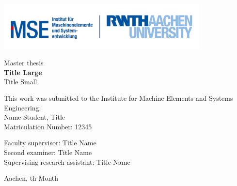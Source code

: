 
\begin{flushright}
\includegraphics[width=0.8\textwidth]{images/logo1.jpg}
\end{flushright}


\begin{flushleft}

\vspace*{3cm}

Master thesis\\
\vspace{1cm}
\Large\textbf{Title Large}\\
\vspace{0.3 cm}
\normalsize\textcolor{gray_1}{Title Small}


\large
\vspace*{9cm}

\normalsize
This work was submitted to the Institute for Machine Elements and Systems Engineering:\\
\vspace{11pt}
\normalsize
\normalsize{Name Student, Title}\\
Matriculation Number: 12345\\

\vspace*{11pt}

Faculty supervisor: Title Name\\
Second examiner: Title Name\\
Supervising research assistant: Title Name\\
\vspace*{18pt}

\vspace*{11pt}
\normalsize{Aachen, \the\day th  Month \the\year} \\
\vspace*{11pt}
\end{flushleft}

\clearpage
\restoregeometry